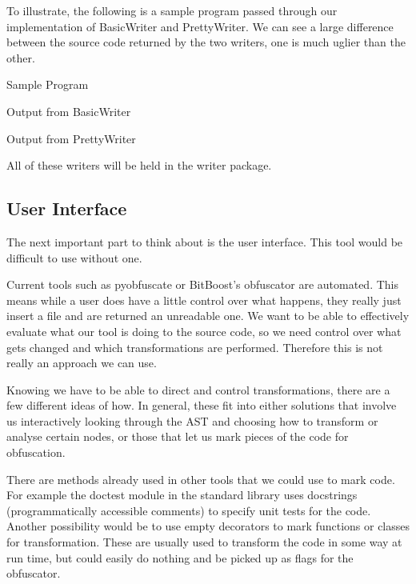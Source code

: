 \documentclass{report}
\begin{document}
To illustrate, the following is a sample program passed through our implementation of BasicWriter and PrettyWriter. We can see a large difference between the source code
returned by the two writers, one is much uglier than the other.

Sample Program



Output from BasicWriter



Output from PrettyWriter



All of these writers will be held in the writer package.

\subsection{User Interface}

The next important part to think about is the user interface. This tool would be difficult to use without one.

Current tools such as pyobfuscate or BitBoost's obfuscator are automated. This means while a user does have a little control
over what happens, they really just insert a file and are returned an unreadable one. We want to be able to effectively
evaluate what our tool is doing to the source code, so we need control over what gets changed and which transformations are
performed. Therefore this is not really an approach we can use.

Knowing we have to be able to direct and control transformations, there are a few different ideas of how. In general, these fit into
either solutions that involve us interactively looking through the AST and choosing how to transform or analyse certain
nodes, or those that let us mark pieces of the code for obfuscation.

There are methods already used in other tools that we could use to mark code. For example the doctest module in the standard
library uses docstrings (programmatically accessible comments) to specify unit tests for the code. Another possibility would
be to use empty decorators to mark functions or classes for transformation. These are usually used to transform the code in
some way at run time, but could easily do nothing and be picked up as flags for the obfuscator.
\end{document}
